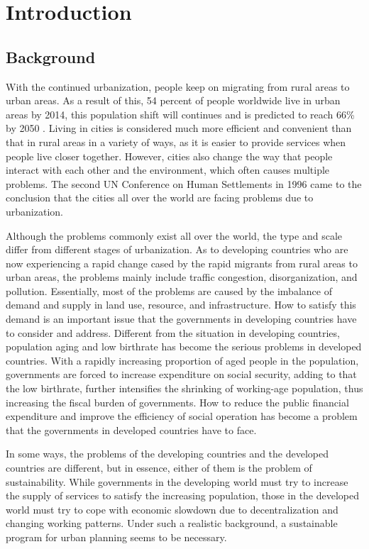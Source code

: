 \chapter{Introduction}

%
\section{Background}
With the continued urbanization, people keep on migrating from rural areas to urban areas. As a result of this, 54 percent of people worldwide live in urban areas by 2014, this population shift will continues and is predicted to reach 66\% by 2050 \cite{un2014world}. Living in cities is considered much more efficient and convenient than that in rural areas in a variety of ways, as it is easier to provide services when people live closer together. However, cities also change the way that people interact with each other and the environment, which often causes multiple problems. The second UN Conference on Human Settlements in 1996 came to the conclusion that the cities all over the world are facing problems due to urbanization.

Although the problems commonly exist all over the world, the type and scale differ from different stages of urbanization. As to developing countries who are now experiencing a rapid change cased by the rapid migrants from rural areas to urban areas, the problems mainly include traffic congestion, disorganization, and pollution. Essentially, most of the problems are caused by the imbalance of demand and supply in land use, resource, and infrastructure. How to satisfy this demand is an important issue that the governments in developing countries have to consider and address. Different from the situation in developing countries, population aging and low birthrate has become the serious problems in developed countries. With a rapidly increasing proportion of aged people in the population, governments are forced to increase expenditure on social security, adding to that the low birthrate, further intensifies the shrinking of working-age population, thus increasing the fiscal burden of governments. How to reduce the public financial expenditure and improve the efficiency of social operation has become a problem that the governments in developed countries have to face. 

In some ways, the problems of the developing countries and the developed countries are different, but in essence, either of them is the problem of sustainability. While governments in the developing world must try to increase the supply of services to satisfy the increasing population, those in the developed world must try to cope with economic slowdown due to decentralization and changing working patterns. Under such a realistic background, a sustainable program for urban planning seems to be necessary. 

